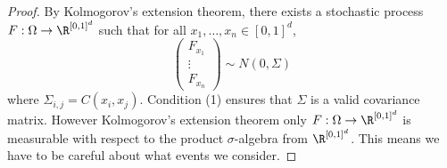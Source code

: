 \documentclass[fontsize=12pt, DIV=10]{scrreprt}
\theoremstyle{mydefn}
\theoremstyle{remark}
\begin{document}
\begin{proof}
	By Kolmogorov's extension theorem, there exists a stochastic process $F: \Omega \to \boxspace$ such that for all $x_1, \ldots, x_n \in [0, 1]^d$, 
	\begin{equation}
		\begin{pmatrix}
			F_{x_1} \\ \vdots \\ F_{x_n}
		\end{pmatrix}
		\sim N(0, \Sigma)
	\end{equation}
	where $\Sigma_{i,j} = C(x_i, x_j)$. Condition (1) ensures that $\Sigma$ is a valid covariance matrix. However Kolmogorov's extension theorem only $F: \Omega \to \boxspace$ is measurable with respect to the product $\sigma$-algebra from $\boxspace$. This means we have to be careful about what events we consider.


\end{proof}
\end{document}
